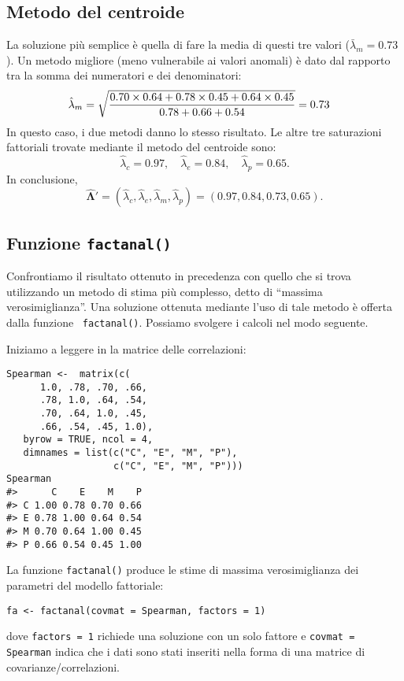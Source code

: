 \subsection{Metodo del centroide}

La soluzione più semplice è quella di fare la media di questi tre valori ($\bar{\lambda}_m = 0.73$). 
Un metodo migliore (meno vulnerabile ai valori anomali) è dato dal rapporto tra la
somma dei numeratori e dei denominatori:
\begin{align}
  \hat{\lambda}_m &= \sqrt{ \frac{0.70 \times 0.64 + 0.78 \times 0.45 + 0.64
      \times 0.45}{0.78+0.66+0.54} } = 0.73 \notag
\end{align}
In questo caso, i due metodi danno lo stesso risultato.
Le altre tre saturazioni fattoriali
trovate mediante il metodo del centroide 
sono: $$\hat{\lambda}_c = 0.97, \quad \hat{\lambda}_e = 0.84, \quad
\hat{\lambda}_p = 0.65.$$ 
In conclusione, $$\boldsymbol{\hat{\Lambda}}'=
(\hat{\lambda}_c, \hat{\lambda}_e, \hat{\lambda}_m, \hat{\lambda}_p) = (0.97, 0.84, 0.73, 0.65).$$ 


\subsection{Funzione \texttt{factanal()}}

Confrontiamo il risultato ottenuto in precedenza con quello che si trova utilizzando un metodo di stima più complesso, detto di \enquote{massima verosimiglianza}.
Una soluzione ottenuta mediante l'uso di tale metodo è offerta dalla funzione \R\, \verb+factanal()+.
Possiamo svolgere i calcoli nel modo seguente. 

Iniziamo a leggere in \R\; la matrice delle correlazioni:
\begin{lstlisting}
Spearman <-  matrix(c(
      1.0, .78, .70, .66, 
      .78, 1.0, .64, .54,  
      .70, .64, 1.0, .45,  
      .66, .54, .45, 1.0), 
   byrow = TRUE, ncol = 4, 
   dimnames = list(c("C", "E", "M", "P"), 
                   c("C", "E", "M", "P")))
Spearman
#>      C    E    M    P
#> C 1.00 0.78 0.70 0.66
#> E 0.78 1.00 0.64 0.54
#> M 0.70 0.64 1.00 0.45
#> P 0.66 0.54 0.45 1.00
\end{lstlisting}
La funzione \verb+factanal()+ produce le stime di massima verosimiglianza dei parametri del modello fattoriale:  
\begin{lstlisting}
fa <- factanal(covmat = Spearman, factors = 1)
\end{lstlisting}
dove \texttt{factors = 1} richiede una soluzione con un solo fattore e \texttt{covmat = Spearman} indica che i dati sono stati inseriti nella forma di una matrice di covarianze/correlazioni.

